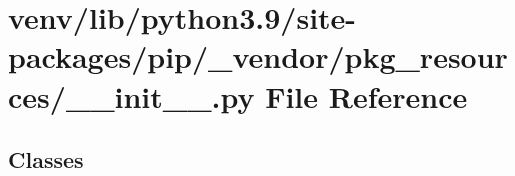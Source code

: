\hypertarget{venv_2lib_2python3_89_2site-packages_2pip_2__vendor_2pkg__resources_2____init_____8py}{}\section{venv/lib/python3.9/site-\/packages/pip/\+\_\+vendor/pkg\+\_\+resources/\+\_\+\+\_\+init\+\_\+\+\_\+.py File Reference}
\label{venv_2lib_2python3_89_2site-packages_2pip_2__vendor_2pkg__resources_2____init_____8py}
\subsection*{Classes}
